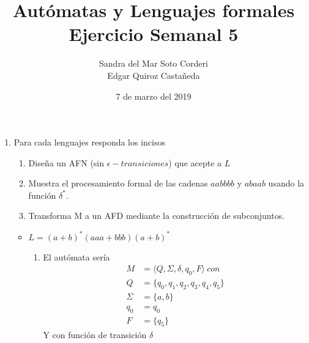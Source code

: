 \documentclass{article}
\begin{document}
    \title{
        Autómatas y Lenguajes formales \\
        Ejercicio Semanal 5
    }

    \author{
        Sandra del Mar Soto Corderi \\
        Edgar Quiroz Castañeda
    }

    \date{
        7 de marzo del 2019
    }
    
    \maketitle

    \begin{enumerate}
        \item {
            Para cada lenguajes responda los incisos
            \begin{enumerate}
                \item Diseña un AFN (sin $\epsilon-transiciones$) que acepte a 
                $L$
                \item Muestra el procesamiento formal de las cadenas $aabbbb$ y 
                $abaab$ usando la función $\delta^{*}$.
                \item Transforma M a un AFD mediante la construcción de 
                subconjuntos.
            \end{enumerate}
            \begin{itemize}
                \item $L = (a + b)^{*}(aaa + bbb)(a + b)^{*}$
                \begin{enumerate}
                    \item {
                        El autómata sería
                        \begin{align*}
                            M &= \langle Q, \Sigma, \delta, q_{0}, F \rangle \ con\\
                            Q &= \{q_{0}, q_{1}, q_{2}, q_{3}, q_{4}, q_{5}\} \\
                            \Sigma &= \{a, b\} \\
                            q_{0} &= q_{0} \\
                            F &= \{q_{5}\}
                        \end{align*}
                        Y con función de transición $\delta$
                        
}
\end{enumerate}
\end{itemize}}
\end{enumerate}
\end{document}
